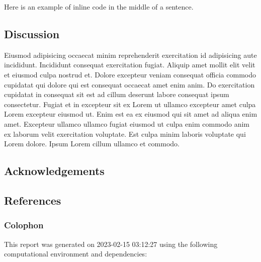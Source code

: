 \documentclass[
  super,
  preprint,
  3p]{elsarticle}
\newlength{\cslhangindent}
\newlength{\cslentryspacingunit} %
\newenvironment{CSLReferences}[2] %
 {%
  \setlength{\parindent}{0pt}
  \ifodd #1
  \let\oldpar\par
  \def\par{\hangindent=\cslhangindent\oldpar}
  \fi
  \setlength{\parskip}{#2\cslentryspacingunit}
 }%
 {}
\begin{document}
\newpage{}

Here is an example of inline code in the middle of a sentence.

\hypertarget{discussion}{%
\subsection{Discussion}\label{discussion}}

Eiusmod adipisicing occaecat minim reprehenderit exercitation id
adipisicing aute incididunt. Incididunt consequat exercitation fugiat.
Aliquip amet mollit elit velit et eiusmod culpa nostrud et. Dolore
excepteur veniam consequat officia commodo cupidatat qui dolore qui est
consequat occaecat amet enim anim. Do exercitation cupidatat in
consequat sit est ad cillum deserunt labore consequat ipsum consectetur.
Fugiat et in excepteur sit ex Lorem ut ullamco excepteur amet culpa
Lorem excepteur eiusmod ut. Enim est ea ex eiusmod qui sit amet ad
aliqua enim amet. Excepteur ullamco ullamco fugiat eiusmod ut culpa enim
commodo anim ex laborum velit exercitation voluptate. Est culpa minim
laboris voluptate qui Lorem dolore. Ipsum Lorem cillum ullamco et
commodo.

\newpage{}

\hypertarget{acknowledgements}{%
\subsection{Acknowledgements}\label{acknowledgements}}

\newpage{}

\newpage{}

\hypertarget{references}{%
\subsection{References}\label{references}}

\hypertarget{refs}{}
\begin{CSLReferences}{0}{0}
\end{CSLReferences}

\newpage{}

\hypertarget{colophon}{%
\subsubsection{Colophon}\label{colophon}}

This report was generated on 2023-02-15 03:12:27 using the following
computational environment and dependencies:
\end{document}
